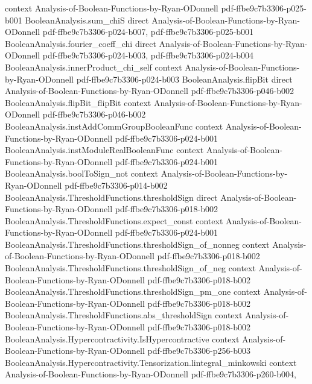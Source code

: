 \begin{theorem}
  {context}
  {Analysis-of-Boolean-Functions-by-Ryan-ODonnell}
  {pdf-ffbe9c7b3306-p025-b001}
\proofstep
  {BooleanAnalysis.sum_chiS}
  {direct}
  {Analysis-of-Boolean-Functions-by-Ryan-ODonnell}
  {pdf-ffbe9c7b3306-p024-b007,
    pdf-ffbe9c7b3306-p025-b001}
\proofstep
  {BooleanAnalysis.fourier_coeff_chi}
  {direct}
  {Analysis-of-Boolean-Functions-by-Ryan-ODonnell}
  {pdf-ffbe9c7b3306-p024-b003,
    pdf-ffbe9c7b3306-p024-b004}
\proofstep
  {BooleanAnalysis.innerProduct_chi_self}
  {context}
  {Analysis-of-Boolean-Functions-by-Ryan-ODonnell}
  {pdf-ffbe9c7b3306-p024-b003}
\proofstep
  {BooleanAnalysis.flipBit}
  {direct}
  {Analysis-of-Boolean-Functions-by-Ryan-ODonnell}
  {pdf-ffbe9c7b3306-p046-b002}
\proofstep
  {BooleanAnalysis.flipBit_flipBit}
  {context}
  {Analysis-of-Boolean-Functions-by-Ryan-ODonnell}
  {pdf-ffbe9c7b3306-p046-b002}
\proofstep
  {BooleanAnalysis.instAddCommGroupBooleanFunc}
  {context}
  {Analysis-of-Boolean-Functions-by-Ryan-ODonnell}
  {pdf-ffbe9c7b3306-p024-b001}
\proofstep
  {BooleanAnalysis.instModuleRealBooleanFunc}
  {context}
  {Analysis-of-Boolean-Functions-by-Ryan-ODonnell}
  {pdf-ffbe9c7b3306-p024-b001}
\proofstep
  {BooleanAnalysis.boolToSign_not}
  {context}
  {Analysis-of-Boolean-Functions-by-Ryan-ODonnell}
  {pdf-ffbe9c7b3306-p014-b002}
\proofstep
  {BooleanAnalysis.ThresholdFunctions.thresholdSign}
  {direct}
  {Analysis-of-Boolean-Functions-by-Ryan-ODonnell}
  {pdf-ffbe9c7b3306-p018-b002}
\proofstep
  {BooleanAnalysis.ThresholdFunctions.expect_const}
  {context}
  {Analysis-of-Boolean-Functions-by-Ryan-ODonnell}
  {pdf-ffbe9c7b3306-p024-b001}
\proofstep
  {BooleanAnalysis.ThresholdFunctions.thresholdSign_of_nonneg}
  {context}
  {Analysis-of-Boolean-Functions-by-Ryan-ODonnell}
  {pdf-ffbe9c7b3306-p018-b002}
\proofstep
  {BooleanAnalysis.ThresholdFunctions.thresholdSign_of_neg}
  {context}
  {Analysis-of-Boolean-Functions-by-Ryan-ODonnell}
  {pdf-ffbe9c7b3306-p018-b002}
\proofstep
  {BooleanAnalysis.ThresholdFunctions.thresholdSign_pm_one}
  {context}
  {Analysis-of-Boolean-Functions-by-Ryan-ODonnell}
  {pdf-ffbe9c7b3306-p018-b002}
\proofstep
  {BooleanAnalysis.ThresholdFunctions.abs_thresholdSign}
  {context}
  {Analysis-of-Boolean-Functions-by-Ryan-ODonnell}
  {pdf-ffbe9c7b3306-p018-b002}
\proofstep
  {BooleanAnalysis.Hypercontractivity.IsHypercontractive}
  {context}
  {Analysis-of-Boolean-Functions-by-Ryan-ODonnell}
  {pdf-ffbe9c7b3306-p256-b003}
\proofstep
  {BooleanAnalysis.Hypercontractivity.Tensorization.lintegral_minkowski}
  {context}
  {Analysis-of-Boolean-Functions-by-Ryan-ODonnell}
  {pdf-ffbe9c7b3306-p260-b004,
}
\end{theorem}
